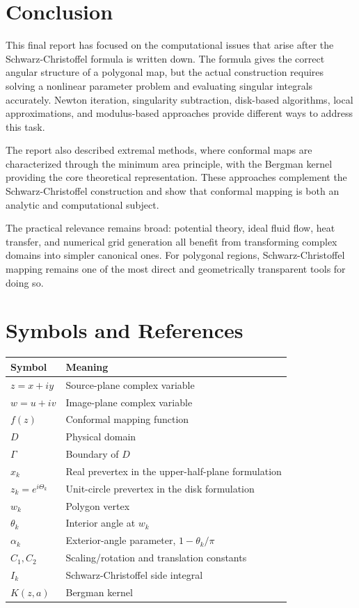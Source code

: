 \documentclass[12pt,a4paper]{article}
\begin{document}
\section{Conclusion}

This final report has focused on the computational issues that arise after the Schwarz-Christoffel formula is written down. The formula gives the correct angular structure of a polygonal map, but the actual construction requires solving a nonlinear parameter problem and evaluating singular integrals accurately. Newton iteration, singularity subtraction, disk-based algorithms, local approximations, and modulus-based approaches provide different ways to address this task.

The report also described extremal methods, where conformal maps are characterized through the minimum area principle, with the Bergman kernel providing the core theoretical representation. These approaches complement the Schwarz-Christoffel construction and show that conformal mapping is both an analytic and computational subject.

The practical relevance remains broad: potential theory, ideal fluid flow, heat transfer, and numerical grid generation all benefit from transforming complex domains into simpler canonical ones. For polygonal regions, Schwarz-Christoffel mapping remains one of the most direct and geometrically transparent tools for doing so.

\newpage
\section*{Symbols and References}

\begin{table}[H]
\centering
\begin{tabular}{@{}ll@{}}
\toprule
Symbol & Meaning \\
\midrule
\(z=x+iy\) & Source-plane complex variable \\
\(w=u+iv\) & Image-plane complex variable \\
\(f(z)\) & Conformal mapping function \\
\(D\) & Physical domain \\
\(\Gamma\) & Boundary of \(D\) \\
\(x_k\) & Real prevertex in the upper-half-plane formulation \\
\(z_k=e^{i\Theta_k}\) & Unit-circle prevertex in the disk formulation \\
\(w_k\) & Polygon vertex \\
\(\theta_k\) & Interior angle at \(w_k\) \\
\(\alpha_k\) & Exterior-angle parameter, \(1-\theta_k/\pi\) \\
\(C_1,C_2\) & Scaling/rotation and translation constants \\
\(I_k\) & Schwarz-Christoffel side integral \\
\(K(z,a)\) & Bergman kernel \\
\bottomrule
\end{tabular}
\end{table}
\end{document}

